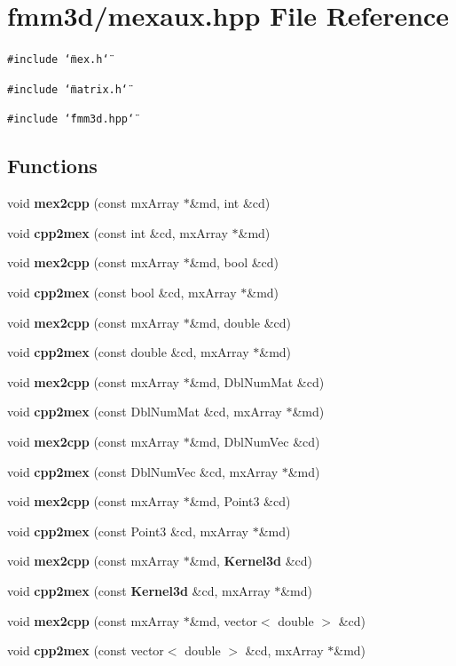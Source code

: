 \section{fmm3d/mexaux.hpp File Reference}
\label{mexaux_8hpp}


{\tt \#include \char`\"{}mex.h\char`\"{}}\par
{\tt \#include \char`\"{}matrix.h\char`\"{}}\par
{\tt \#include \char`\"{}fmm3d.hpp\char`\"{}}\par
\subsection*{Functions}
\begin{CompactItemize}
\item 
void {\bf mex2cpp} (const mx\-Array $\ast$\&md, int \&cd)
\item 
void {\bf cpp2mex} (const int \&cd, mx\-Array $\ast$\&md)
\item 
void {\bf mex2cpp} (const mx\-Array $\ast$\&md, bool \&cd)
\item 
void {\bf cpp2mex} (const bool \&cd, mx\-Array $\ast$\&md)
\item 
void {\bf mex2cpp} (const mx\-Array $\ast$\&md, double \&cd)
\item 
void {\bf cpp2mex} (const double \&cd, mx\-Array $\ast$\&md)
\item 
void {\bf mex2cpp} (const mx\-Array $\ast$\&md, Dbl\-Num\-Mat \&cd)
\item 
void {\bf cpp2mex} (const Dbl\-Num\-Mat \&cd, mx\-Array $\ast$\&md)
\item 
void {\bf mex2cpp} (const mx\-Array $\ast$\&md, Dbl\-Num\-Vec \&cd)
\item 
void {\bf cpp2mex} (const Dbl\-Num\-Vec \&cd, mx\-Array $\ast$\&md)
\item 
void {\bf mex2cpp} (const mx\-Array $\ast$\&md, Point3 \&cd)
\item 
void {\bf cpp2mex} (const Point3 \&cd, mx\-Array $\ast$\&md)
\item 
void {\bf mex2cpp} (const mx\-Array $\ast$\&md, {\bf Kernel3d} \&cd)
\item 
void {\bf cpp2mex} (const {\bf Kernel3d} \&cd, mx\-Array $\ast$\&md)
\item 
void {\bf mex2cpp} (const mx\-Array $\ast$\&md, vector$<$ double $>$ \&cd)
\item 
void {\bf cpp2mex} (const vector$<$ double $>$ \&cd, mx\-Array $\ast$\&md)

\end{CompactItemize}
